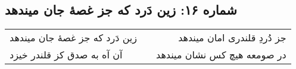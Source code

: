 \begin{center}
\section*{شماره ۱۶: زین دَرد که جز غصۀ جان میندهد}
\label{sec:016}
\begin{longtable}{l p{0.5cm} r}
زین دَرد که جز غصهٔ جان میندهد
&&
جز دُردِ قلندری امان میندهد
\\
آن آه به صدق کز قلندر خیزد
&&
در صومعه هیچ کس نشان میندهد
\\
\end{longtable}
\end{center}
